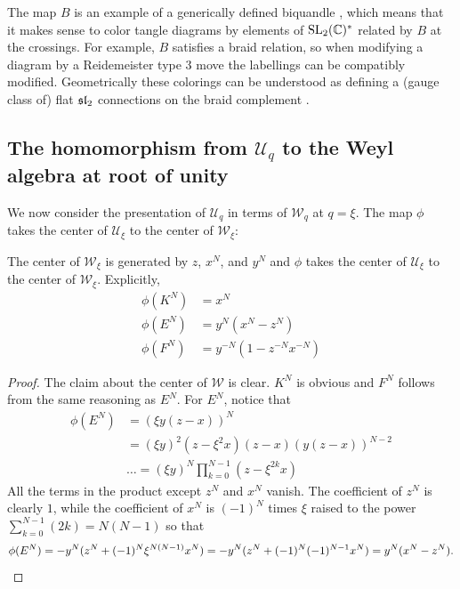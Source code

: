 \documentclass{sl2ams}
\numberwithin{equation}{section}
\newcommand{\U}{\mathcal{U}}
\newcommand{\W}{\mathcal{W}}
\begin{document}
The map \(B\) is an example of a generically defined biquandle \cite[Section 6]{Blanchet2018}, which means that it makes sense to color tangle diagrams by elements of \(\operatorname{SL}_2(\mathbb{C})^*\) related by \(B\) at the crossings.
For example, \(B\) satisfies a braid relation, so when modifying a diagram by a Reidemeister type 3 move the labellings can be compatibly modified.
Geometrically these colorings can be understood as defining a (gauge class of) flat \(\mathfrak{sl}_2\) connections on the braid complement \cite{Kashaev2005,Blanchet2018,McPhailSnyder2022}.


\subsection{The homomorphism from \texorpdfstring{$\U_q$}{Uq} to the Weyl algebra at root of unity}
We now consider the presentation of \(\U_q\) in terms of \(\W_q\) at \(q = \xi\).
The map $\phi$ takes the center of $\U_\xi$ to the center of $\W_\xi$:
\begin{lemma}
  The center of $\W_{\xi}$ is generated by $z$, $x^N$, and $y^N$ and $\phi$ takes the center of $\U_\xi$ to the center of $\W_{\xi}$.
  Explicitly,
  \begin{equation*}
    \begin{aligned}
      \phi(K^N)
      &=
      x^N
      \\
      \phi(E^N)
      &=
      y^N(x^N - z^N)
      \\
      \phi(F^N)
      &=
      y^{-N}(1 - z^{-N} x^{-N})
    \end{aligned} 
  \end{equation*}
\end{lemma}
\begin{proof}
  The claim about the center of \(\W\) is clear.
  $K^N$ is obvious and $F^N$ follows from the same reasoning as $E^N$.
  For $E^N$, notice that
  \begin{align*}
    \phi(E^N)
    &=
    \left( \xi y (z - x) \right)^{N}
    \\
    &=
    (\xi y)^2 (z - \xi^2 x) (z - x) \left( y (z - x ) \right)^{N-2}
    \\
    &\dots
    =
    (\xi y)^N \prod_{k=0}^{N-1} (z - \xi^{2k} x)
  \end{align*}
  All the terms in the product except $z^N$ and $x^N$ vanish.
  The coefficient of $z^N$ is clearly $1$, while the coefficient of $x^N$ is $(-1)^{N}$ times $\xi$ raised to the power
  \(
    \sum_{k=0}^{N-1} (2 k) =  N(N-1)
  \)
  so that
  \[
    \phi(E^N)
    = -y^N( z^N + (-1)^{N} \xi^{N(N-1)} x^N)
    = -y^N( z^N + (-1)^{N} (-1)^{N-1} x^N)
    = y^N( x^N - z^N). \qedhere
  \]
\end{proof}
\end{document}
